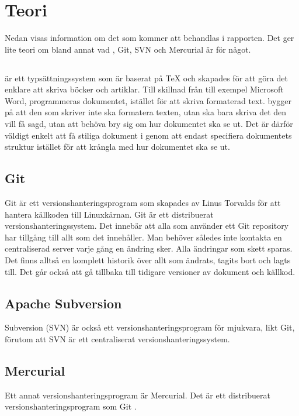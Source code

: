 \section{Teori}
\label{sec:theory-tuhkala}
Nedan visas information om det som kommer att behandlas i rapporten. Det ger lite teori om bland annat vad \latex, Git, SVN och Mercurial är för något.

\subsection{\latex}
\latex \cite{latex_project}\cite{latex_wiki} är ett typsättningssystem som är baserat på TeX och skapades för att göra det enklare att skriva böcker och artiklar. Till skillnad från till exempel Microsoft Word, programmeras dokumentet, istället för att skriva formaterad text. \latex bygger på att den som skriver inte ska formatera texten, utan ska bara skriva det den vill få sagd, utan att behöva bry sig om hur dokumentet ska se ut. Det är därför väldigt enkelt att få stiliga dokument i \latex genom att endast specifiera dokumentets struktur istället för att krångla med hur dokumentet ska se ut.

\subsection{Git}
Git \cite{git_history}\cite{git} är ett versionshanteringsprogram som skapades av Linus Torvalds för att hantera källkoden till Linuxkärnan. Git är ett distribuerat versionshanteringssystem. Det innebär att alla som använder ett Git repository har tillgång till allt som det innehåller. Man behöver således inte kontakta en centraliserad server varje gång en ändring sker. Alla ändringar som skett sparas. Det finns alltså en komplett historik över allt som ändrats, tagits bort och lagts till. Det går också att gå tillbaka till tidigare versioner av dokument och källkod.

\subsection{Apache Subversion}
Subversion (SVN) \cite{svn} är också ett versionshanteringsprogram för mjukvara, likt Git, förutom att SVN är ett centraliserat versionshanteringssystem.

\subsection{Mercurial}
Ett annat versionshanteringsprogram är Mercurial. Det är ett distribuerat versionshanteringsprogram som Git \cite{mercurial}.

